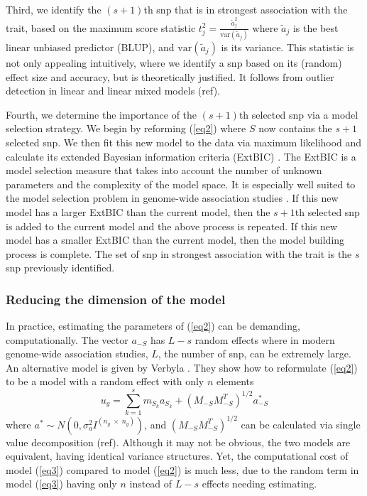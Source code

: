 \documentclass{nature}
\begin{document}
Third, we identify the $(s+1)$th snp that is in strongest association with the trait, based on the maximum score statistic
$t_j^2 = \frac{ \widetilde{a} _j^2}{\textrm{var}(\widetilde{a}_j)}$ where $\widetilde{a}_j$ is the best linear unbiased predictor (BLUP), 
and $\textrm{var}(\widetilde{a}_j)$ is its variance. This statistic is not only appealing intuitively, where we 
identify a snp based on its (random) effect size and accuracy, but is theoretically justified.  It follows from outlier detection 
in linear and linear mixed models (ref). 

Fourth, we determine the importance of the $(s+1)$th selected snp via a model selection strategy. 
We begin by reforming (\ref{eq2}) where $S$ now contains the $s + 1$ selected snp.  We then fit this new model to the data
via maximum likelihood and calculate its extended Bayesian information criteria (ExtBIC) \cite{chen2008extended}.  The ExtBIC is a model selection measure that takes into account the number of unknown parameters and the complexity 
of the model space.  It is especially well suited to the model selection problem in genome-wide association studies \cite{chen2008extended}. If this new model has a larger ExtBIC than the current model, then the $s+1$th selected snp is added to 
the current model and the above process is repeated. If this new model has a smaller ExtBIC than the current model, then the 
model building process is complete. The set of snp in strongest association with the trait is the $s$ snp previously identified. 

\subsubsection{Reducing the dimension of the model}
In practice, estimating the parameters of (\ref{eq2}) can be demanding, computationally. 
The vector $a_{-S}$ has $L-s$ random effects where in modern genome-wide association studies, 
$L$, the number of snp, can be extremely large.  An alternative model is given by 
Verbyla \cite{verbyla2012rwgaim,verbyla2014whole}. 
They show how to reformulate (\ref{eq2}) to be a model with a random effect with only $n$ elements
\begin{equation}
\label{eq3}
u_g = \sum_{k=1}^s  m_{S_k} a_{S_k} + (M_{-S} M_{-S}^T)^{1/2} a^*_{-S}
\end{equation}
where $a^* \sim N(0, \sigma_a^2 I^{(n_g \; \times \;  n_g)})$, and 
$(M_{-S} M_{-S}^T)^{1/2}$ can be calculated via single value decomposition (ref).  
Although it may not be obvious, the two models are equivalent, 
having identical variance structures. Yet, the computational cost of model (\ref{eq3}) compared to 
model (\ref{eq2}) is much less, due to the random term in model (\ref{eq3}) having only $n$ instead of $L-s$ 
effects needing estimating. 
\end{document}
